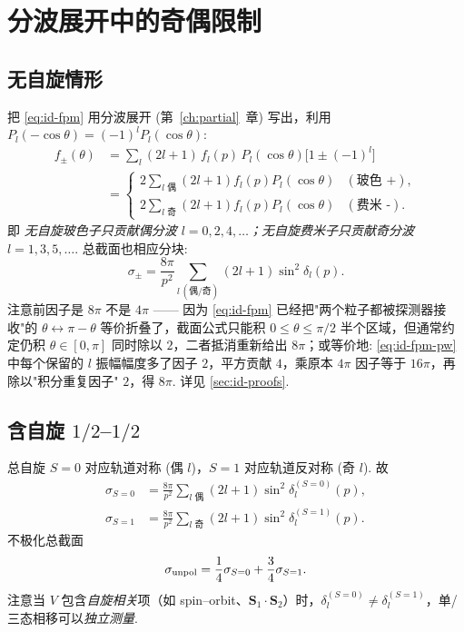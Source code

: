 \section{分波展开中的奇偶限制}\label{sec:id-pw}

\subsection{无自旋情形}\label{sec:id-pw-spinless}

把 \eqref{eq:id-fpm} 用分波展开 (第~\ref{ch:partial}~章) 写出，利用 $P_l(-\cos\theta)=(-1)^l P_l(\cos\theta)$:
\begin{align}
  f_\pm(\theta)&=\sum_l(2l+1)\,f_l(p)\,P_l(\cos\theta)\bigl[1\pm(-1)^l\bigr]\nonumber\\
  &=
  \begin{cases}
    2\sum_{l\text{ 偶}}(2l+1)f_l(p)P_l(\cos\theta) & (\text{玻色 +}),\\
    2\sum_{l\text{ 奇}}(2l+1)f_l(p)P_l(\cos\theta) & (\text{费米 -}).
  \end{cases}
  \label{eq:id-fpm-pw}
\end{align}
即 \emph{无自旋玻色子只贡献偶分波 $l=0,2,4,\ldots$；无自旋费米子只贡献奇分波 $l=1,3,5,\ldots$}. 总截面也相应分块:
\begin{equation}
  \sigma_\pm=\frac{8\pi}{p^2}\sum_{l\,(\text{偶/奇})}(2l+1)\sin^2\delta_l(p).
  \label{eq:id-sigma-pw}
\end{equation}
注意前因子是 $8\pi$ 不是 $4\pi$ —— 因为 \eqref{eq:id-fpm} 已经把"两个粒子都被探测器接收"的 $\theta\leftrightarrow\pi-\theta$ 等价折叠了，截面公式只能积 $0\le\theta\le\pi/2$ 半个区域，但通常约定仍积 $\theta\in[0,\pi]$ 同时除以 $2$，二者抵消重新给出 $8\pi$；或等价地: \eqref{eq:id-fpm-pw} 中每个保留的 $l$ 振幅幅度多了因子 $2$，平方贡献 $4$，乘原本 $4\pi$ 因子等于 $16\pi$，再除以"积分重复因子" $2$，得 $8\pi$. 详见 \ref{sec:id-proofs}.

\subsection{含自旋 $1/2$--$1/2$}\label{sec:id-pw-spin}

总自旋 $S=0$ 对应轨道对称 (偶 $l$)，$S=1$ 对应轨道反对称 (奇 $l$). 故
\begin{equation}
  \begin{aligned}
    \sigma_{S=0}&=\frac{8\pi}{p^2}\sum_{l\text{ 偶}}(2l+1)\sin^2\delta_l^{(S=0)}(p),\\
    \sigma_{S=1}&=\frac{8\pi}{p^2}\sum_{l\text{ 奇}}(2l+1)\sin^2\delta_l^{(S=1)}(p).
  \end{aligned}
\end{equation}
不极化总截面
\begin{equation}
  \sigma_{\rm unpol}=\frac{1}{4}\sigma_{S=0}+\frac{3}{4}\sigma_{S=1}.
\end{equation}
注意当 $V$ 包含\emph{自旋相关}项（如 spin--orbit、$\bm S_1\cdot\bm S_2$）时，$\delta_l^{(S=0)}\neq\delta_l^{(S=1)}$，单/三态相移可以\emph{独立测量}.

